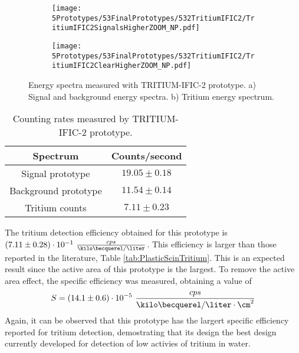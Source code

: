 \begin{figure}
\centering
    \begin{subfigure}[b]{0.73\textwidth}
    \centering
    \texttt{[image: 5Prototypes/53FinalPrototypes/532TritiumIFIC2/TritiumIFIC2SignalsHigherZOOM\_NP.pdf]}  
    \caption{\label{subfig:SignalBackgroundEnergySpectraTritiumIFIC2}}
    \end{subfigure}
    \hfill
    \begin{subfigure}[b]{0.73\textwidth}
    \centering
    \texttt{[image: 5Prototypes/53FinalPrototypes/532TritiumIFIC2/TritiumIFIC2ClearHigherZOOM\_NP.pdf]}  
    \caption{\label{subfig:TritiumEnergySpectraTritiumIFIC2}}
    \end{subfigure}
 \caption{Energy spectra measured with TRITIUM-IFIC-2 prototype. a) Signal and background energy spectra. b) Tritium energy spectrum.}
 \label{fig:EnergySpectraTRITIUMIFIC2}
\end{figure}

\begin{table}[htbp]
\centering{}%
\begin{tabular}{cc}
\toprule 
Spectrum & Counts/second \tabularnewline
\midrule
\midrule 
Signal prototype & $19.05 \pm 0.18$ \tabularnewline
Background prototype & $11.54 \pm 0.14$ \tabularnewline  
Tritium counts & $7.11 \pm 0.23$ \tabularnewline
\bottomrule
\end{tabular}
\caption{Counting rates measured by TRITIUM-IFIC-2 prototype.}
\label{tab:CountsPerSecondTRITIUMIFIC2}
\end{table}
The tritium detection efficiency obtained for this prototype is $(7.11 \pm 0.28)\cdot{} 10^{-1}~\frac{cps}{\kilo\becquerel/\liter}$. This efficiency is larger than those reported in the literature, Table \ref{tab:PlasticScinTritium}. This is an expected result since the active area of this prototype is the largest. To remove the active area effect, the specific efficiency was measured, obtaining a value of 
$$S=(14.1 \pm 0.6)\cdot{} 10^{-5}~\frac{cps}{\kilo\becquerel/\liter \cdot{} \cm^{2}}$$
Again, it can be observed that this prototype has the largert specific efficiency reported for tritium detection, demostrating that its design the best design currently developed for detection of low activies of tritium in water.

